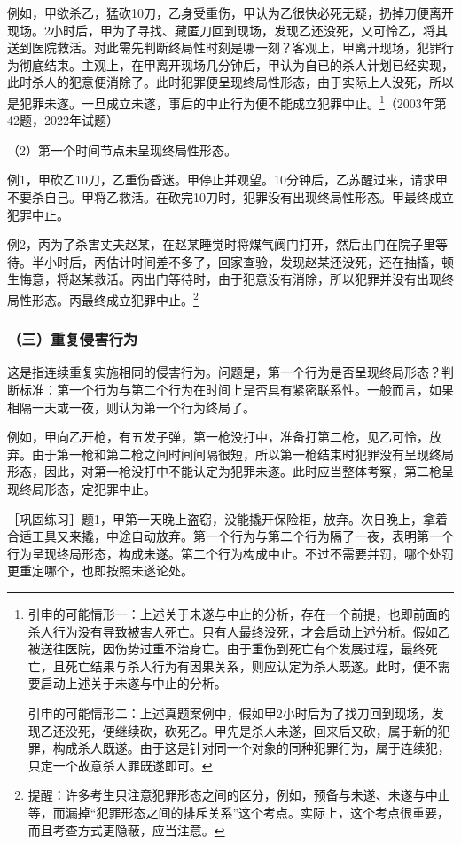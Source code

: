 例如，甲欲杀乙，猛砍10刀，乙身受重伤，甲认为乙很快必死无疑，扔掉刀便离开现场。2小时后，甲为了寻找、藏匿刀回到现场，发现乙还没死，又可怜乙，将其送到医院救活。对此需先判断终局性时刻是哪一刻？客观上，甲离开现场，犯罪行为彻底结束。主观上，在甲离开现场几分钟后，甲认为自已的杀人计划已经实现，此时杀人的犯意便消除了。此时犯罪便呈现终局性形态，由于实际上人没死，所以是犯罪未遂。一旦成立未遂，事后的中止行为便不能成立犯罪中止。\footnote{引申的可能情形一：上述关于未遂与中止的分析，存在一个前提，也即前面的杀人行为没有导致被害人死亡。只有人最终没死，才会启动上述分析。假如乙被送往医院，因伤势过重不治身亡。由于重伤到死亡有个发展过程，最终死亡，且死亡结果与杀人行为有因果关系，则应认定为杀人既遂。此时，便不需要启动上述关于未遂与中止的分析。

引申的可能情形二：上述真题案例中，假如甲2小时后为了找刀回到现场，发现乙还没死，便继续砍，砍死乙。甲先是杀人未遂，回来后又砍，属于新的犯罪，构成杀人既遂。由于这是针对同一个对象的同种犯罪行为，属于连续犯，只定一个故意杀人罪既遂即可。}（2003年第42题，2022年试题）

（2）第一个时间节点未呈现终局性形态。

例1，甲砍乙10刀，乙重伤昏迷。甲停止并观望。10分钟后，乙苏醒过来，请求甲不要杀自己。甲将乙救活。在砍完10刀时，犯罪没有出现终局性形态。甲最终成立犯罪中止。

例2，丙为了杀害丈夫赵某，在赵某睡觉时将煤气阀门打开，然后出门在院子里等待。半小时后，丙估计时间差不多了，回家查验，发现赵某还没死，还在抽搐，顿生悔意，将赵某救活。丙出门等待时，由于犯意没有消除，所以犯罪并没有出现终局性形态。丙最终成立犯罪中止。\footnote{提醒：许多考生只注意犯罪形态之间的区分，例如，预备与未遂、未遂与中止等，而漏掉“犯罪形态之间的排斥关系”这个考点。实际上，这个考点很重要，而且考查方式更隐蔽，应当注意。}

\subsubsection*{（三）重复侵害行为}

这是指连续重复实施相同的侵害行为。问题是，第一个行为是否呈现终局形态？判断标准：第一个行为与第二个行为在时间上是否具有紧密联系性。一般而言，如果相隔一天或一夜，则认为第一个行为终局了。

例如，甲向乙开枪，有五发子弹，第一枪没打中，准备打第二枪，见乙可怜，放弃。由于第一枪和第二枪之间时间间隔很短，所以第一枪结束时犯罪没有呈现终局形态，因此，对第一枪没打中不能认定为犯罪未遂。此时应当整体考察，第二枪呈现终局形态，定犯罪中止。

［巩固练习］题1，甲第一天晚上盗窃，没能撬开保险柜，放弃。次日晚上，拿着合适工具又来撬，中途自动放弃。第一个行为与第二个行为隔了一夜，表明第一个行为呈现终局形态，构成未遂。第二个行为构成中止。不过不需要并罚，哪个处罚更重定哪个，也即按照未遂论处。

